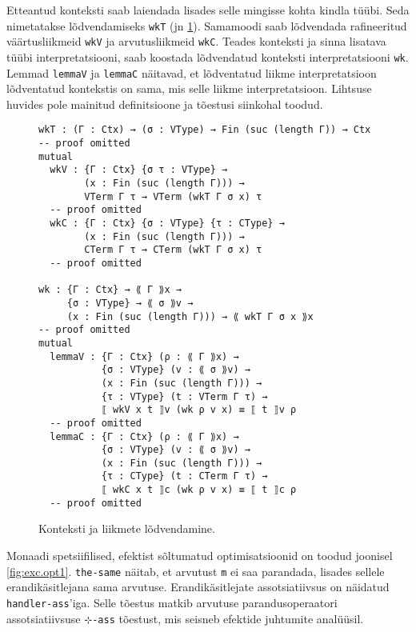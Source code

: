 \documentclass[a4paper,12pt]{article}
\begin{document}
Etteantud konteksti saab laiendada lisades selle mingisse kohta kindla tüübi.
Seda nimetatakse lõdvendamiseks {\tt wkT} (jn \ref{fig:weakening}).
Samamoodi saab lõdvendada rafineeritud väärtusliikmeid {\tt wkV} ja arvutusliikmeid {\tt wkC}.
Teades konteksti ja sinna lisatava tüübi interpretatsiooni, saab koostada lõdvendatud konteksti interpretatsiooni {\tt wk}.
Lemmad {\tt lemmaV} ja {\tt lemmaC} näitavad, et lõdventatud liikme interpretatsioon lõdventatud kontekstis on sama, mis selle liikme interpretatsioon.
Lihtsuse huvides pole mainitud definitsioone ja tõestusi siinkohal toodud.
\begin{figure}
  \begin{BVerbatim}
wkT : (Γ : Ctx) → (σ : VType) → Fin (suc (length Γ)) → Ctx
-- proof omitted
mutual
  wkV : {Γ : Ctx} {σ τ : VType} →
        (x : Fin (suc (length Γ))) →
        VTerm Γ τ → VTerm (wkT Γ σ x) τ
  -- proof omitted
  wkC : {Γ : Ctx} {σ : VType} {τ : CType} →
        (x : Fin (suc (length Γ))) →
        CTerm Γ τ → CTerm (wkT Γ σ x) τ
  -- proof omitted

wk : {Γ : Ctx} → ⟪ Γ ⟫x →
     {σ : VType} → ⟪ σ ⟫v →
     (x : Fin (suc (length Γ))) → ⟪ wkT Γ σ x ⟫x 
-- proof omitted
mutual
  lemmaV : {Γ : Ctx} (ρ : ⟪ Γ ⟫x) →
           {σ : VType} (v : ⟪ σ ⟫v) →
           (x : Fin (suc (length Γ))) →
           {τ : VType} (t : VTerm Γ τ) →
           ⟦ wkV x t ⟧v (wk ρ v x) ≡ ⟦ t ⟧v ρ
  -- proof omitted
  lemmaC : {Γ : Ctx} (ρ : ⟪ Γ ⟫x) →
           {σ : VType} (v : ⟪ σ ⟫v) →
           (x : Fin (suc (length Γ))) →
           {τ : CType} (t : CTerm Γ τ) →
           ⟦ wkC x t ⟧c (wk ρ v x) ≡ ⟦ t ⟧c ρ
  -- proof omitted
\end{BVerbatim}
  \caption{Konteksti ja liikmete lõdvendamine.}
  \label{fig:weakening}
\end{figure}


Monaadi spetsiifilised, efektist sõltumatud optimisatsioonid on toodud joonisel \ref{fig:exc.opt1}.
{\tt the-same} näitab, et arvutust {\tt m} ei saa parandada, lisades sellele erandikäsitlejana sama arvutuse.
Erandikäsitlejate assotsiatiivsus on näidatud {\tt handler-ass}'iga.
Selle tõestus matkib arvutuse parandusoperaatori assotsiatiivsuse {\tt ⊹-ass} tõestust, mis seisneb efektide juhtumite analüüsil.
\end{document}
